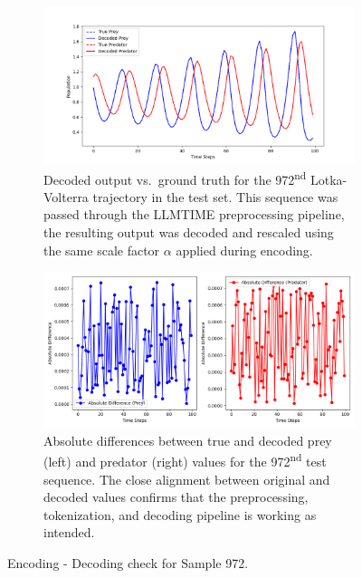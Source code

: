 \documentclass[a4paper,12pt]{article}
\begin{document}
\begin{figure}[H]
  \centering

  \begin{subfigure}[t]{0.95\textwidth}
      \centering
      \includegraphics[width=\textwidth]{true_vs_decoded.png}
      \caption{Decoded output vs.\ ground truth for the 972\textsuperscript{nd} Lotka-Volterra trajectory in the test set. This sequence was passed through the LLMTIME preprocessing pipeline, the resulting output was decoded and rescaled using the same scale factor $\alpha$ applied during encoding.}
      \label{fig:true_vs_decoded}
  \end{subfigure}

  \vspace{0.5cm}

  \begin{subfigure}[t]{0.95\textwidth}
      \centering
      \includegraphics[width=\textwidth]{absolute_differences.png}
      \caption{Absolute differences between true and decoded prey (left) and predator (right) values for the 972\textsuperscript{nd} test sequence.  The close alignment between original and decoded values confirms that the preprocessing, tokenization, and decoding pipeline is working as intended.}
      \label{fig:absolute_differences}
  \end{subfigure}
  \vspace{0.5cm}
  \caption{ Encoding - Decoding check for Sample 972.}
  \label{fig:decoding_pipeline_evaluation}
\end{figure}
\end{document}
